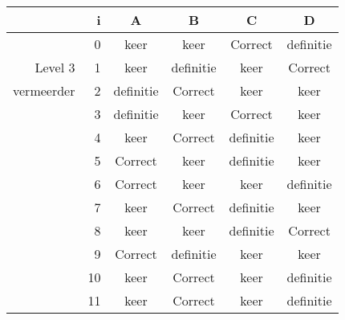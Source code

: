 \begin{tabular}{ rr| c|c|c|c}\hline\hline
     & i & \textbf{A} & \textbf{B} & \textbf{C} & \textbf{D}\\\hline

&0&keer&keer&Correct\cellcolor[gray]{0.6}&definitie\\
Level 3 & 1&keer&definitie&keer&Correct\cellcolor[gray]{0.6}\\
vermeerder &2&definitie&Correct\cellcolor[gray]{0.6}&keer&keer\\
&3&definitie&keer&Correct\cellcolor[gray]{0.6}&keer\\
&4&keer&Correct\cellcolor[gray]{0.6}&definitie&keer\\
&5&Correct\cellcolor[gray]{0.6}&keer&definitie&keer\\
&6&Correct\cellcolor[gray]{0.6}&keer&keer&definitie\\
&7&keer&Correct\cellcolor[gray]{0.6}&definitie&keer\\
&8&keer&keer&definitie&Correct\cellcolor[gray]{0.6}\\
&9&Correct\cellcolor[gray]{0.6}&definitie&keer&keer\\
&10&keer&Correct\cellcolor[gray]{0.6}&keer&definitie\\
&11&keer&Correct\cellcolor[gray]{0.6}&keer&definitie\\
\hline\end{tabular}\par\ \newline

